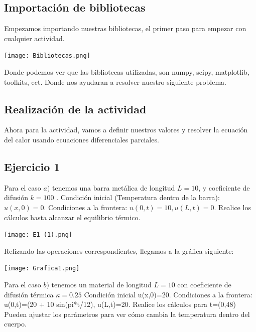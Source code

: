 \documentclass[12pt]{article}
\begin{document}
\subsection{Importación de bibliotecas}
Empezamos importando nuestras bibliotecas, el primer paso para empezar con cualquier actividad.

\begin{center}
    \texttt{[image: Bibliotecas.png]}
\end{center}
 
 Donde podemos ver que las bibliotecas utilizadas, son numpy, scipy, matplotlib, toolkits, ect. Donde nos ayudaran a resolver nuestro siguiente problema.




\subsection*{Realización de la actividad}
Ahora para la actividad, vamos a definir nuestros valores y resolver la ecuación del calor usando ecuaciones diferenciales parciales.


\subsection{Ejercicio 1}

Para el caso $a)$ tenemos una barra metálica de longitud $L = 10$, y coeficiente de difusión  $k = 100$ . Condición inicial (Temperatura dentro de la barra): $u(x,0) = 0$. Condiciones a la frontera: $u(0,t) = 10, u(L,t) = 0$. Realice los cálculos hasta alcanzar el equilibrio térmico.

\begin{center}
    \texttt{[image: E1 (1).png]}
\end{center}

Relizando las operaciones correspondientes, llegamos a la gráfica siguiente:

\begin{center}
    \texttt{[image: Grafica1.png]}
\end{center}


Para el caso $b)$ tenemos un material de longitud $L=10$ con coeficiente de difusión térmica $\kappa=0.25$ Condición inicial u(x,0)=20. Condiciones a la frontera: u(0,t)=(20 + 10 sin(pi*t/12), u(L,t)=20. Realice los cálculos para t=(0,48) Pueden ajustar los parámetros para ver cómo cambia la temperatura dentro del cuerpo.
\end{document}
